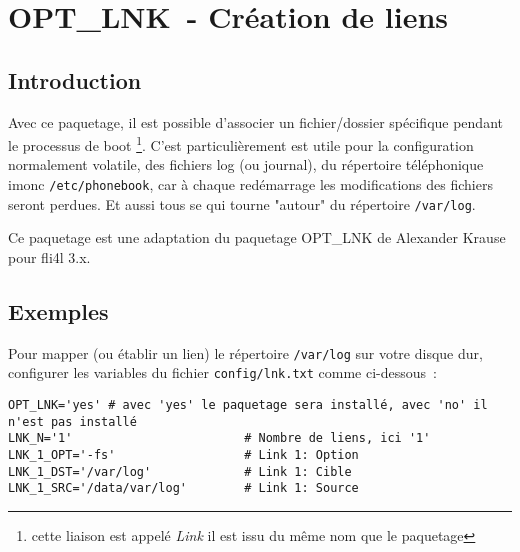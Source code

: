 {
\section {OPT\_LNK~- Création de liens}
}

\subsection {Introduction}

Avec ce paquetage, il est possible d'associer un fichier/dossier spécifique
pendant le processus de boot \footnote{cette liaison est appelé \emph{Link} il
est issu du même nom que le paquetage}. C'est particulièrement est utile pour
la configuration normalement volatile, des fichiers log (ou journal), du
répertoire téléphonique imonc \texttt{/etc/phonebook}, car à chaque redémarrage
les modifications des fichiers seront perdues. Et aussi tous se qui tourne
"autour" du répertoire \texttt{/var/log}.

Ce paquetage est une adaptation du paquetage OPT\_LNK de Alexander Krause
pour fli4l 3.x.

\subsection {Exemples}

Pour mapper (ou établir un lien) le répertoire \texttt{/var/log} sur votre disque
dur, configurer les variables du fichier \texttt{config/lnk.txt} comme ci-dessous~:

\begin{small}
\begin{example}
\begin{verbatim}
OPT_LNK='yes' # avec 'yes' le paquetage sera installé, avec 'no' il n'est pas installé
LNK_N='1'                        # Nombre de liens, ici '1'
LNK_1_OPT='-fs'                  # Link 1: Option
LNK_1_DST='/var/log'             # Link 1: Cible
LNK_1_SRC='/data/var/log'        # Link 1: Source
\end{verbatim}
\end{example}
\end{small}


